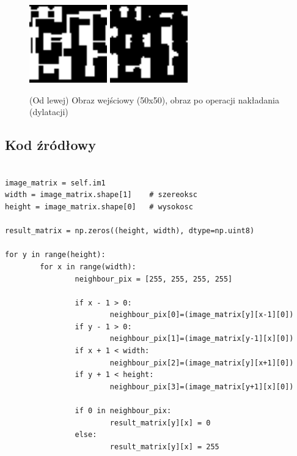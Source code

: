 \documentclass[final,a4paper,openany,12pt]{mwbk}
\begin{document}
\begin{figure}[H]
	\begin{center}
		\includegraphics[width=0.3\textwidth]{2/2Bin_D_Original}
		\includegraphics[width=0.3\textwidth]{2/2Bin_D_Result}
	\end{center}
	\caption{(Od lewej) Obraz wejściowy (50x50), obraz po operacji nakładania (dylatacji)}
\end{figure}


\subsection*{Kod źródłowy}

\begin{lstlisting}[caption= Operacja nakładania (dylatacji) na obrazie binarnym]

image_matrix = self.im1
width = image_matrix.shape[1]    # szereoksc
height = image_matrix.shape[0]   # wysokosc

result_matrix = np.zeros((height, width), dtype=np.uint8)

for y in range(height):
        for x in range(width):  
                neighbour_pix = [255, 255, 255, 255]

                if x - 1 > 0:
                        neighbour_pix[0]=(image_matrix[y][x-1][0])
                if y - 1 > 0:
                        neighbour_pix[1]=(image_matrix[y-1][x][0])
                if x + 1 < width:
                        neighbour_pix[2]=(image_matrix[y][x+1][0])
                if y + 1 < height:
                        neighbour_pix[3]=(image_matrix[y+1][x][0])

                if 0 in neighbour_pix:
                        result_matrix[y][x] = 0
                else:
                        result_matrix[y][x] = 255          

\end{lstlisting}
\end{document}
